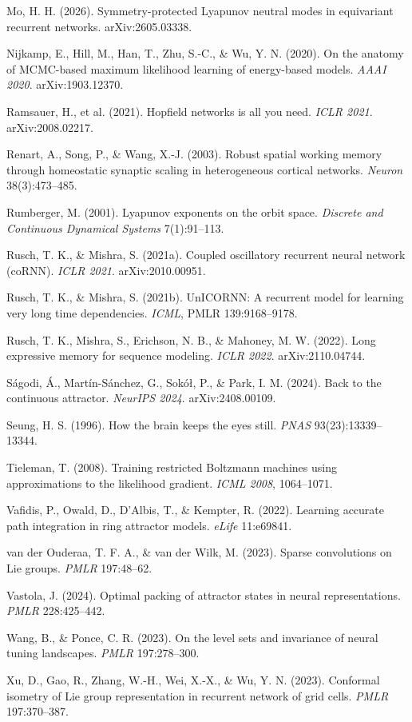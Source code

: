 \documentclass{article}
\begin{document}
Mo, H. H. (2026). Symmetry-protected Lyapunov neutral modes in equivariant recurrent networks. arXiv:2605.03338.

Nijkamp, E., Hill, M., Han, T., Zhu, S.-C., \& Wu, Y. N. (2020). On the anatomy of MCMC-based maximum likelihood learning of energy-based models. \emph{AAAI 2020}. arXiv:1903.12370.

Ramsauer, H., et al. (2021). Hopfield networks is all you need. \emph{ICLR 2021}. arXiv:2008.02217.

Renart, A., Song, P., \& Wang, X.-J. (2003). Robust spatial working memory through homeostatic synaptic scaling in heterogeneous cortical networks. \emph{Neuron} 38(3):473--485.

Rumberger, M. (2001). Lyapunov exponents on the orbit space. \emph{Discrete and Continuous Dynamical Systems} 7(1):91--113.

Rusch, T. K., \& Mishra, S. (2021a). Coupled oscillatory recurrent neural network (coRNN). \emph{ICLR 2021}. arXiv:2010.00951.

Rusch, T. K., \& Mishra, S. (2021b). UnICORNN: A recurrent model for learning very long time dependencies. \emph{ICML}, PMLR 139:9168--9178.

Rusch, T. K., Mishra, S., Erichson, N. B., \& Mahoney, M. W. (2022). Long expressive memory for sequence modeling. \emph{ICLR 2022}. arXiv:2110.04744.

S\'agodi, \'A., Mart\'in-S\'anchez, G., Sokó\l, P., \& Park, I. M. (2024). Back to the continuous attractor. \emph{NeurIPS 2024}. arXiv:2408.00109.

Seung, H. S. (1996). How the brain keeps the eyes still. \emph{PNAS} 93(23):13339--13344.


Tieleman, T. (2008). Training restricted Boltzmann machines using approximations to the likelihood gradient. \emph{ICML 2008}, 1064--1071.

Vafidis, P., Owald, D., D'Albis, T., \& Kempter, R. (2022). Learning accurate path integration in ring attractor models. \emph{eLife} 11:e69841.

van der Ouderaa, T. F. A., \& van der Wilk, M. (2023). Sparse convolutions on Lie groups. \emph{PMLR} 197:48--62.

Vastola, J. (2024). Optimal packing of attractor states in neural representations. \emph{PMLR} 228:425--442.

Wang, B., \& Ponce, C. R. (2023). On the level sets and invariance of neural tuning landscapes. \emph{PMLR} 197:278--300.

Xu, D., Gao, R., Zhang, W.-H., Wei, X.-X., \& Wu, Y. N. (2023). Conformal isometry of Lie group representation in recurrent network of grid cells. \emph{PMLR} 197:370--387.
\endgroup
\end{document}
